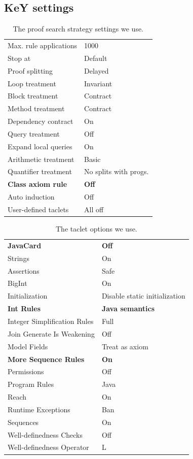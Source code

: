 \documentclass[runningheads]{llncs}
\begin{document}
\subsection{KeY settings}

\begin{table}
    \begin{tabular}{l@{\hskip6pt}|@{\hskip6pt}l}
    Max. rule applications & 1000 \\
    Stop at & Default \\
    Proof splitting & Delayed \\
    Loop treatment & Invariant \\
    Block treatment & Contract \\
    Method treatment & Contract \\
    Dependency contract & On \\
    Query treatment & Off \\
    Expand local queries & On \\
    Arithmetic treatment & Basic \\
    Quantifier treatment & No splits with progs. \\
    \textbf{Class axiom rule} & \textbf{Off} \\
    Auto induction & Off \\
    User-defined taclets & All off
    \end{tabular}
    \medskip
    \caption{The proof search strategy settings we use.}
    \label{tab:proof-strategy}
\end{table}
\begin{table}
    \begin{tabular}{l@{\hskip6pt}|@{\hskip6pt}l}
    \textbf{JavaCard} & \textbf{Off} \\
    Strings & On \\
    Assertions & Safe \\
    BigInt & On \\
    Initialization & Disable static initialization \\
    \textbf{Int Rules} & \textbf{Java semantics} \\
    Integer Simplification Rules & Full \\
    Join Generate Is Weakening & Off \\
    Model Fields & Treat as axiom \\
    \textbf{More Sequence Rules} & \textbf{On} \\
    Permissions & Off \\
    Program Rules & Java \\
    Reach & On \\
    Runtime Exceptions & Ban \\
    Sequences & On \\
    Well-definedness Checks & Off \\
    Well-definedness Operator & L
    \end{tabular}
    \medskip
    \caption{The taclet options we use.}
    \label{tab:taclet-options}
\end{table}
\end{document}
